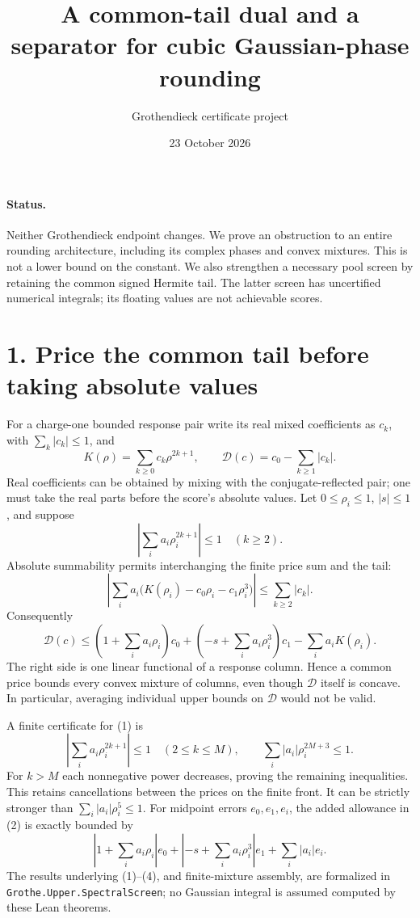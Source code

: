 \documentclass[11pt]{article}
\title{A common-tail dual and a separator for cubic Gaussian-phase rounding}
\author{Grothendieck certificate project}
\date{23 October 2026}
\newcommand{\D}{\mathcal D}
\begin{document}
\maketitle

\paragraph{Status.}
Neither Grothendieck endpoint changes. We prove an obstruction to an entire
rounding architecture, including its complex phases and convex mixtures. This
is not a lower bound on the constant. We also strengthen a necessary pool
screen by retaining the common signed Hermite tail. The latter screen has
uncertified numerical integrals; its floating values are not achievable scores.

\section*{1. Price the common tail before taking absolute values}
For a charge-one bounded response pair write its real mixed coefficients as
$c_k$, with $\sum_k|c_k|\le1$, and
\[
 K(\rho)=\sum_{k\ge0}c_k\rho^{2k+1},\qquad
 \D(c)=c_0-\sum_{k\ge1}|c_k|.
\]
Real coefficients can be obtained by mixing with the conjugate-reflected
pair; one must take the real parts before the score's absolute values.
Let $0\le\rho_i\le1$, $|s|\le1$, and suppose
\[
 \left|\sum_i a_i\rho_i^{2k+1}\right|\le1\quad(k\ge2).
 \tag{1}
\]
Absolute summability permits interchanging the finite price sum and the tail:
\[
 \left|\sum_i a_i\bigl(K(\rho_i)-c_0\rho_i-c_1\rho_i^3\bigr)\right|
 \le\sum_{k\ge2}|c_k|.
\]
Consequently
\[
 \boxed{\D(c)\le
 (1+\sum_i a_i\rho_i)c_0+
 (-s+\sum_i a_i\rho_i^3)c_1-\sum_i a_iK(\rho_i).}\tag{2}
\]
The right side is one linear functional of a response column. Hence a common
price bounds every convex mixture of columns, even though $\D$ itself is concave.
In particular, averaging individual upper bounds on $\D$ would not be valid.

A finite certificate for (1) is
\[
 \left|\sum_i a_i\rho_i^{2k+1}\right|\le1\quad(2\le k\le M),\qquad
 \sum_i|a_i|\rho_i^{2M+3}\le1.\tag{3}
\]
For $k>M$ each nonnegative power decreases, proving the remaining inequalities.
This retains cancellations between the prices on the finite front. It can be
strictly stronger than $\sum_i|a_i|\rho_i^5\le1$.
For midpoint errors $e_0,e_1,e_i$, the added allowance in (2) is exactly bounded by
\[
 |1+\sum_i a_i\rho_i|e_0+
 |-s+\sum_i a_i\rho_i^3|e_1+\sum_i|a_i|e_i.\tag{4}
\]
The results underlying (1)--(4), and finite-mixture assembly, are formalized in
\texttt{Grothe.Upper.SpectralScreen}; no Gaussian integral is assumed computed
by these Lean theorems.
\end{document}
